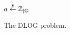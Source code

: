 \begin{figure}[t]
\begin{algorithm}[H]
    \caption{\label{alg.dlog} The \textsc{DLOG} problem.}
    \begin{algorithmic}[1]
            \State$a \overset{\$}{\gets} \mathbb{Z}_{|\mathbb{G}|}$
            \State{}
        \EndFunction
        \vskip8pt
    \end{algorithmic}
\end{algorithm}
\end{figure}
